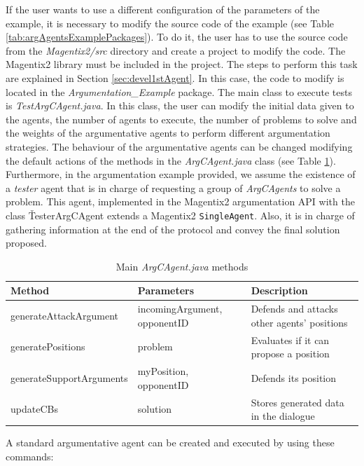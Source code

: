 If the user wants to use a different configuration of the parameters of the example, it is necessary to modify the source code of the example (see Table \ref{tab:argAgentsExamplePackages}). To do it, the user has to use the source code from the \textit{Magentix2/src} directory and create a project to modify the code. The Magentix2 library must be included in the project. The steps to perform this task are explained in Section \ref{sec:devel1stAgent}. In this case, the code to modify is located in the \textit{Argumentation\_Example} package. The main class to execute tests is \textit{TestArgCAgent.java}. In this class, the user can modify the initial data given to the agents, the number of agents to execute, the number of problems to solve and the weights of the argumentative agents to perform different argumentation strategies. The behaviour of the argumentative agents can be changed modifying the default actions of the methods in the \textit{ArgCAgent.java} class (see Table \ref{tab:ArgCAgentMethods}). Furthermore, in the argumentation example provided, we assume the existence of a \emph{tester} agent that is in charge of requesting a group of \emph{ArgCAgents} to solve a problem. This agent, implemented in the Magentix2 argumentation API with the class \v{TesterArgCAgent} extends a Magentix2 \lstinline{SingleAgent}. Also, it is in charge of gathering information at the end of the protocol and convey the final solution proposed.

\begin{table}[h!t]
\begin{tabular}{|l|p{4cm}|p{5cm}|}
\hline
\textbf{Method} & \textbf{Parameters} & \textbf{Description} \\ \hline
generateAttackArgument & incomingArgument, opponentID & Defends and attacks other agents' positions \\ \hline
generatePositions & problem & Evaluates if it can propose a position \\ \hline
generateSupportArguments & myPosition, opponentID & Defends its position \\ \hline
updateCBs & solution &  Stores generated data in the dialogue \\ \hline
\end{tabular}
\caption{Main \textit{ArgCAgent.java} methods}
\label{tab:ArgCAgentMethods}
\end{table}


A standard argumentative agent can be created and executed by using these commands:


